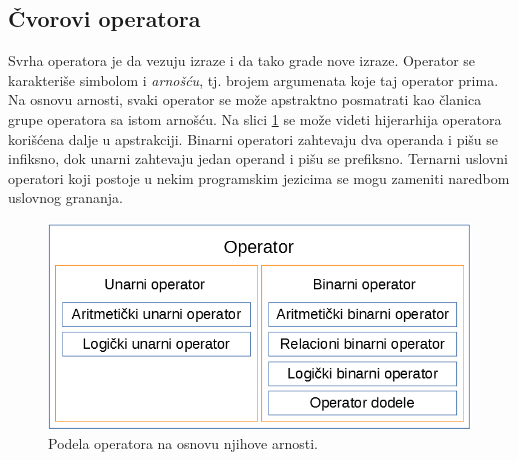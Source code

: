 \subsection{Čvorovi operatora}
\label{subsec:MyASTOperatorNodes}

Svrha operatora je da vezuju izraze i da tako grade nove izraze. Operator se karakteriše simbolom i \emph{arnošću}, tj. brojem argumenata koje taj operator prima. Na osnovu arnosti, svaki operator se može apstraktno posmatrati kao članica grupe operatora sa istom arnošću. Na slici \ref{fig:OperatorNodes} se može videti hijerarhija operatora korišćena dalje u apstrakciji. Binarni operatori zahtevaju dva operanda i pišu se infiksno, dok unarni zahtevaju jedan operand i pišu se prefiksno. Ternarni uslovni operatori koji postoje u nekim programskim jezicima se mogu zameniti naredbom uslovnog grananja. 

\begin{figure}[h!]
\centering
\includegraphics[scale=0.5]{images/operator_nodes.png}
\caption{Podela operatora na osnovu njihove arnosti.}
\label{fig:OperatorNodes}
\end{figure}

